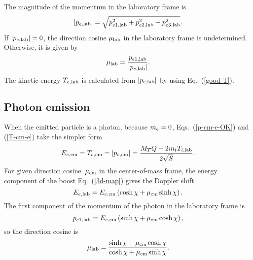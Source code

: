 {The magnitude of the momentum in the laboratory frame is
$$
  |p_{e,\textrm{lab}}| = \sqrt{ p_{e1,\textrm{lab}}^2 + p_{e2,\textrm{lab}}^2 + p_{e3,\textrm{lab}}^2 }.
$$
If $|p_{e,\textrm{lab}}| = 0$, the direction cosine $\mu_{\text{lab}}$ in the laboratory
frame is undetermined.  Otherwise, it is given by
$$
  \mu_{\text{lab}} = \frac{p_{e1,\textrm{lab}}}{|p_{e,\textrm{lab}}|}.
$$
The kinetic energy $T_{e,\textrm{lab}}$ is calculated from $|p_{e,\textrm{lab}}|$
by using Eq.~(\ref{good-T}).

\subsection{Photon emission}
When the emitted particle is a photon, because $m_e = 0$,
Eqs.~(\ref{p-cm-e-OK}) and (\ref{T-cm-e}) take the simpler form
$$
  E_{e, \textrm{cm}} = T_{e,\textrm{cm}} = |p_{e,\textrm{cm}}| =
   \frac{ M_T Q +  2m_t T_{i,\textrm{lab}} }
                {2 \sqrt{S} }.
$$
For given direction cosine~$\mu_{\text{cm}}$ in the center-of-mass frame,
the energy component of the boost Eq.~(\ref{3d-map}) gives the
Doppler shift
$$
   E_{e, \textrm{lab}} = E_{e, \textrm{cm}}
     \left( \cosh \chi + \mu_{\text{cm}} \sinh \chi \right).
$$
The first component of the momentum of the photon in the laboratory
frame is
$$
  p_{e1,\textrm{lab}} =  E_{e, \textrm{cm}}
     \left( \sinh \chi + \mu_{\text{cm}} \cosh \chi \right),
$$
so the direction cosine is
$$
  \mu_{\text{lab}} = \frac{\sinh \chi + \mu_{\text{cm}} \cosh \chi}
                {\cosh \chi + \mu_{\text{cm}} \sinh \chi}.
$$

} %
